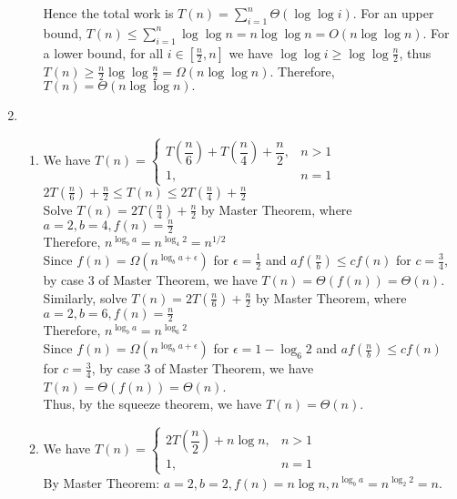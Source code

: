 \documentclass[12pt,a4paper]{article}
\begin{document}
\begin{enumerate}
\begin{enumerate}
        Hence the total work is
        $T(n)=\displaystyle\sum_{i=1}^{n}\Theta(\log\log i).$
        For an upper bound,
        $T(n)\le\displaystyle\sum_{i=1}^{n}\log\log n = n\log\log n=O(n\log\log n).$
        For a lower bound, for all $i\in[\frac{n}{2},n]$ we have $\log\log i\ge \log\log\frac{n}{2}$, thus
        $T(n)\ge \frac{n}{2}\log\log\frac{n}{2}=\Omega(n\log\log n).$
        Therefore,
        $T(n)=\Theta(n\log\log n).$
    \end{enumerate}
    \item 
    \begin{enumerate}
        \item We have 
        $T(n)=
        \begin{cases}
        T\left(\dfrac{n}{6}\right)+T\left(\dfrac{n}{4}\right)+\dfrac{n}{2}, & n>1\\
        1, & n=1
        \end{cases}$\\
        $2T(\frac{n}{6})+\frac{n}{2}\le T(n)\le 2T(\frac{n}{4})+\frac{n}{2}$\\
        Solve $T(n)=2T(\frac{n}{4})+\frac{n}{2}$ by Master Theorem, where $a=2,b=4,f(n)=\frac{n}{2}$\\
        Therefore, $n^{\log_b a}=n^{\log_4 2}=n^{1/2}$\\
        Since $f(n)=\Omega(n^{\log_b a+\epsilon})$ for $\epsilon=\frac{1}{2}$ and $af(\frac{n}{b})\le cf(n)$ for $c=\frac{3}{4}$, by case 3 of Master Theorem, we have $T(n)=\Theta(f(n))=\Theta(n)$.\\
        Similarly, solve $T(n)=2T(\frac{n}{6})+\frac{n}{2}$ by Master Theorem, where $a=2,b=6,f(n)=\frac{n}{2}$\\
        Therefore, $n^{\log_b a}=n^{\log_6 2}$\\
        Since $f(n)=\Omega(n^{\log_b a+\epsilon})$ for $\epsilon=1-\log_6 2$ and $af(\frac{n}{b})\le cf(n)$ for $c=\frac{3}{4}$, by case 3 of Master Theorem, we have $T(n)=\Theta(f(n))=\Theta(n)$.\\
        Thus, by the squeeze theorem, we have $T(n)=\Theta(n)$.
        \item We have 
        $T(n) =
        \begin{cases}
        2T\left(\dfrac{n}{2}\right) + n \log n, & n > 1 \\
        1, & n = 1
        \end{cases}$\\
        By Master Theorem:
        $a = 2, b = 2, f(n) = n \log n, n^{\log_b a} = n^{\log_2 2} = n.$\\

\end{enumerate}
\end{enumerate}
\end{document}
